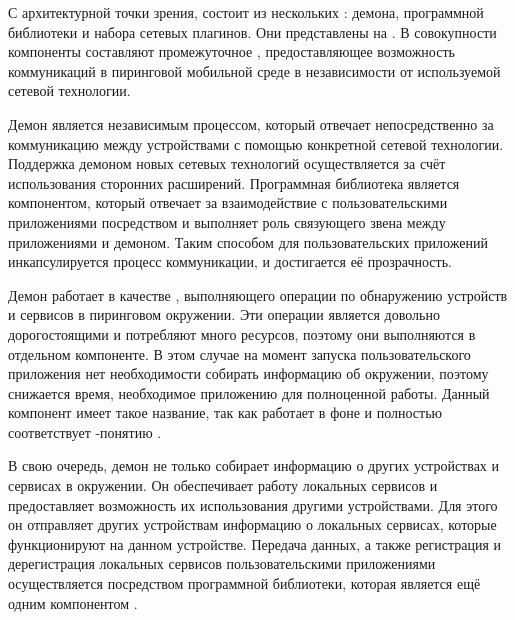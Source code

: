 %
С архитектурной точки зрения,  состоит из нескольких : демона, программной библиотеки и набора сетевых плагинов.
%
Они представлены на . 
%
В совокупности компоненты составляют промежуточное , предоставляющее возможность коммуникаций в пиринговой мобильной среде в независимости от используемой сетевой технологии.


%
Демон  является независимым процессом, который отвечает непосредственно за коммуникацию между устройствами с помощью конкретной сетевой технологии.
%
Поддержка демоном новых сетевых технологий осуществляется за счёт использования сторонних расширений.
%
Программная библиотека  является компонентом, который отвечает за взаимодействие с пользовательскими приложениями посредством  и выполняет роль связующего звена между приложениями и демоном.
%
Таким способом для пользовательских приложений инкапсулируется процесс коммуникации, и достигается её прозрачность.



%
Демон  работает в качестве , выполняющего операции по обнаружению устройств и сервисов в пиринговом окружении.
%
Эти операции является довольно дорогостоящими и потребляют много ресурсов, поэтому они выполняются в отдельном компоненте.
%
В этом случае на момент запуска пользовательского приложения нет необходимости собирать информацию об окружении, поэтому снижается время, необходимое приложению для полноценной работы.
%
Данный компонент имеет такое название, так как работает в фоне и полностью соответствует -понятию  .

%
В свою очередь, демон не только собирает информацию о других устройствах и сервисах в окружении.
%
Он обеспечивает работу локальных сервисов и предоставляет возможность их использования другими устройствами.
%
Для этого он отправляет других устройствам информацию о локальных сервисах, которые функционируют на данном устройстве.
%
Передача данных, а также регистрация и дерегистрация локальных сервисов пользовательскими приложениями осуществляется посредством программной библиотеки, которая является ещё одним компонентом .

